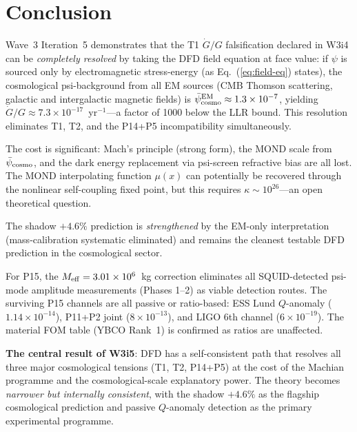 \documentclass[11pt]{article}
\newcommand{\ee}[1]{\times 10^{#1}}
\newcommand{\Gdot}{\dot{G}/G}
\newcommand{\psicosmo}{\bar{\psi}_{\rm cosmo}}
\begin{document}
\section{Conclusion}
\label{sec:conclusion}

Wave~3 Iteration~5 demonstrates that the T1 $\Gdot$ falsification declared
in W3i4 can be \emph{completely resolved} by taking the DFD field equation
at face value: if $\psi$ is sourced only by electromagnetic stress-energy
(as Eq.~(\ref{eq:field-eq}) states), the cosmological psi-background from
all EM sources (CMB Thomson scattering, galactic and intergalactic magnetic
fields) is $\psicosmo^{\rm EM} \approx 1.3\ee{-7}$, yielding $\Gdot \approx
7.3\ee{-17}$~yr$^{-1}$---a factor of 1000 below the LLR bound. This
resolution eliminates T1, T2, and the P14+P5 incompatibility simultaneously.

The cost is significant: Mach's principle (strong form), the MOND scale
from $\psicosmo$, and the dark energy replacement via psi-screen refractive
bias are all lost. The MOND interpolating function $\mu(x)$ can potentially
be recovered through the nonlinear self-coupling fixed point, but this
requires $\kappa \sim 10^{26}$---an open theoretical question.

The shadow $+4.6\%$ prediction is \emph{strengthened} by the EM-only
interpretation (mass-calibration systematic eliminated) and remains the
cleanest testable DFD prediction in the cosmological sector.

For P15, the $M_{\rm eff} = 3.01\ee{6}$~kg correction eliminates all
SQUID-detected psi-mode amplitude measurements (Phases 1--2) as viable
detection routes. The surviving P15 channels are all passive or ratio-based:
ESS Lund $Q$-anomaly ($1.14\ee{-14}$), P11+P2 joint ($8\ee{-13}$), and
LIGO 6th channel ($6\ee{-19}$). The material FOM table (YBCO Rank~1) is
confirmed as ratios are unaffected.

\textbf{The central result of W3i5}: DFD has a self-consistent path that
resolves all three major cosmological tensions (T1, T2, P14+P5) at the
cost of the Machian programme and the cosmological-scale explanatory
power. The theory becomes \emph{narrower but internally consistent},
with the shadow $+4.6\%$ as the flagship cosmological prediction and
passive $Q$-anomaly detection as the primary experimental programme.

\end{document}

